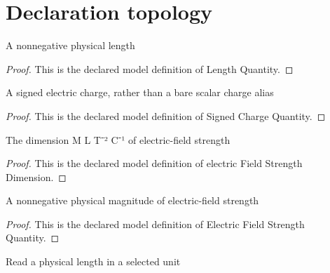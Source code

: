 \section{Declaration topology}
\begin{definition}
  \label{def:physics:phyx-mini-0832:phyxminiproblems-problemphyxmini0832-lengthquantity}
  A nonnegative physical length
\end{definition}
\begin{proof}
  This is the declared model definition of Length Quantity.
\end{proof}
\begin{definition}
  \label{def:physics:phyx-mini-0832:phyxminiproblems-problemphyxmini0832-signedchargequantity}
  A signed electric charge, rather than a bare scalar charge alias
\end{definition}
\begin{proof}
  This is the declared model definition of Signed Charge Quantity.
\end{proof}
\begin{definition}
  \label{def:physics:phyx-mini-0832:phyxminiproblems-problemphyxmini0832-electricfieldstrengthdimension}
  The dimension M L T⁻² C⁻¹ of electric-field strength
\end{definition}
\begin{proof}
  This is the declared model definition of electric Field Strength Dimension.
\end{proof}
\begin{definition}
  \label{def:physics:phyx-mini-0832:phyxminiproblems-problemphyxmini0832-electricfieldstrengthquantity}
  A nonnegative physical magnitude of electric-field strength
\end{definition}
\begin{proof}
  This is the declared model definition of Electric Field Strength Quantity.
\end{proof}
\begin{definition}
  \label{def:physics:phyx-mini-0832:phyxminiproblems-problemphyxmini0832-lengthreadout}
  Read a physical length in a selected unit
\end{definition}
